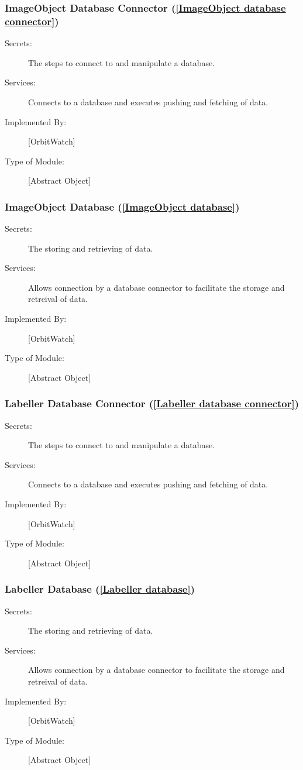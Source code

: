 \documentclass[12pt, titlepage]{article}
\begin{document}
\subsubsection{ImageObject Database Connector (\ref{ImageObject database connector})}
\begin{description}
\item[Secrets:] The steps to connect to and manipulate a database.
\item[Services:] Connects to a database and executes pushing and fetching of data.
\item[Implemented By:] [OrbitWatch]
\item[Type of Module:] [Abstract Object]
\end{description}

\subsubsection{ImageObject Database (\ref{ImageObject database})}
\begin{description}
\item[Secrets:] The storing and retrieving of data.
\item[Services:] Allows connection by a database connector to facilitate the storage and retreival of data.
\item[Implemented By:] [OrbitWatch]
\item[Type of Module:] [Abstract Object]
\end{description}

\subsubsection{Labeller Database Connector (\ref{Labeller database connector})}
\begin{description}
\item[Secrets:] The steps to connect to and manipulate a database.
\item[Services:] Connects to a database and executes pushing and fetching of data.
\item[Implemented By:] [OrbitWatch]
\item[Type of Module:] [Abstract Object]
\end{description}

\subsubsection{Labeller Database (\ref{Labeller database})}
\begin{description}
\item[Secrets:] The storing and retrieving of data.
\item[Services:] Allows connection by a database connector to facilitate the storage and retreival of data.
\item[Implemented By:] [OrbitWatch]
\item[Type of Module:] [Abstract Object]
\end{description}
\end{document}
